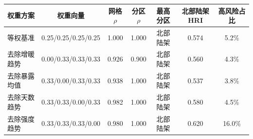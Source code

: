 \begin{tabular}{lcccccc}
\hline
权重方案 & 权重向量 & 网格$\rho$ & 分区$\rho$ & 最高分区 & 北部陆架HRI & 高风险占比 \\
\hline
等权基准 & 0.25/0.25/0.25/0.25 & 1.000 & 1.000 & 北部陆架 & 0.574 & 5.2\% \\
去除增暖趋势 & 0.00/0.33/0.33/0.33 & 0.926 & 0.900 & 北部陆架 & 0.560 & 4.3\% \\
去除暴露均值 & 0.33/0.00/0.33/0.33 & 0.938 & 1.000 & 北部陆架 & 0.537 & 3.8\% \\
去除天数趋势 & 0.33/0.33/0.00/0.33 & 0.982 & 1.000 & 北部陆架 & 0.580 & 4.5\% \\
去除强度趋势 & 0.33/0.33/0.33/0.00 & 0.980 & 1.000 & 北部陆架 & 0.620 & 16.0\% \\
\hline
\end{tabular}
